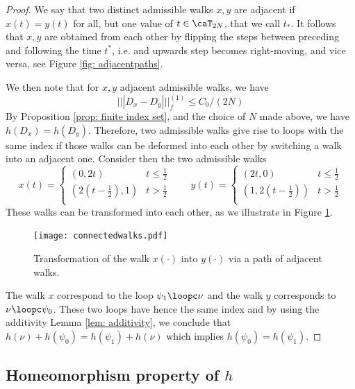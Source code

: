 \begin{proof}
	We say that two distinct admissible walks $x,y$ are adjacent if $x(t)=y(t)$ for all, but one value of $t\in\caT_{2N}$, that we call $t_*$.  It follows that $x,y$ are obtained from each other by flipping the steps between preceding and following the time $t^*$, i.e. and upwards step becomes right-moving, and vice versa, see Figure \ref{fig: adjacentpaths}.  
	
	We then note that for $x,y$ adjacent admissible walks, we have
	$$
	||| D_x-D_y |||^{(1)}_f \leq C_0/(2N)
	$$
	By Proposition \ref{prop: finite index set}, and the choice of $N$ made above, we have $h(D_x)=h(D_y)$.  Therefore, two admissible walks give rise to loops with the same index if those walks can be deformed into each other by switching a walk into an adjacent one. 
	Consider then the two admissible walks
	$$
	x(t)=\begin{cases} (0,2t) &  t \leq \tfrac{1}{2} \\
		(2(t- \tfrac{1}{2}),1) &  t  > \tfrac{1}{2} \\
	\end{cases}
	\qquad
	y(t)=\begin{cases} (2t,0) &  t \leq \tfrac{1}{2} \\
		(1, 2(t- \tfrac{1}{2}) ) &    t  > \tfrac{1}{2}  \\
	\end{cases}
	$$
	These walks can be transformed into each other, as we illustrate in Figure \ref{fig: connected walks}.
	\begin{figure}[htb!]
		\begin{center}
			\texttt{[image: connectedwalks.pdf]}
			\caption{Transformation of the walk $x(\cdot)$ into $y(\cdot)$ via a path of adjacent walks. 
			}
			\label{fig: connected walks}
		\end{center}
	\end{figure} 
	The walk $x$ correspond to the loop $\psi_1\loopc\nu$ and the walk $y$ corresponds to $\nu\loopc\psi_0$. These two loops have hence the same index and by using the additivity Lemma \ref{lem: additivity}, we conclude that $h(\nu)+h(\psi_0)= h(\psi_1)+h(\nu)$ which implies  $h(\psi_0)= h(\psi_1)$. 
\end{proof}


\subsection{Homeomorphism property of $h$}\label{sec: group homomorfism}

